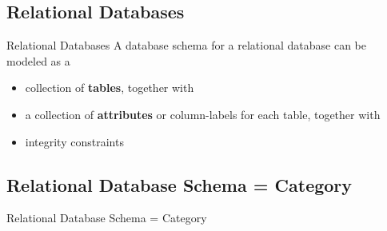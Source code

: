 \documentclass[utf8x]{beamer}
\begin{document}
  \subsection{Relational Databases}
    \begin{frame}{Relational Databases}
      A database schema for a relational database can be modeled as a
      \begin{itemize}
        \item collection of \textbf{tables}, \pause together with
        \item a collection of \textbf{attributes} or column-labels for each table, \pause together with
        \item integrity constraints \pause
      \end{itemize}
      \begin{center}
      \end{center}
    \end{frame}

  \subsection{Relational Database Schema = Category}
    \begin{frame}{Relational Database Schema = Category}
      \begin{center}
      \end{center}
    \end{frame}
\end{document}
